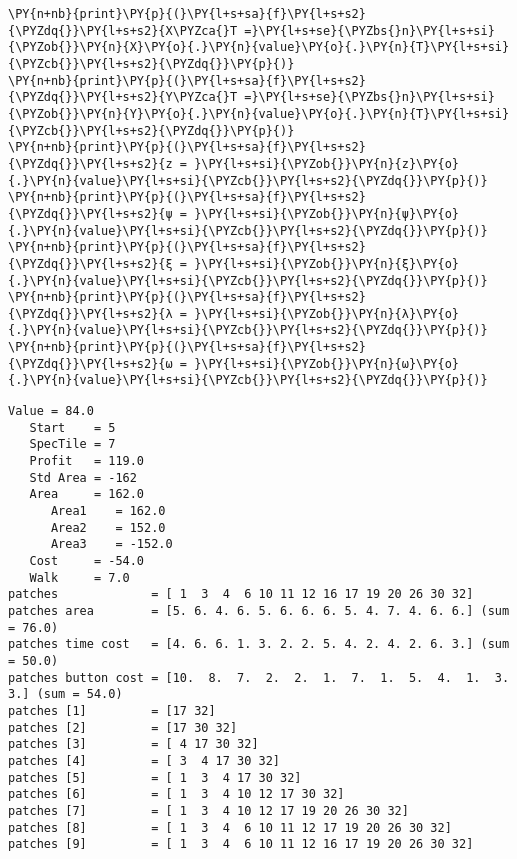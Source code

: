 \begin{tcolorbox}[breakable, size=fbox, boxrule=1pt, pad at break*=1mm,colback=cellbackground, colframe=cellborder]
\begin{Verbatim}[commandchars=\\\{\}]
\PY{n+nb}{print}\PY{p}{(}\PY{l+s+sa}{f}\PY{l+s+s2}{\PYZdq{}}\PY{l+s+s2}{X\PYZca{}T =}\PY{l+s+se}{\PYZbs{}n}\PY{l+s+si}{\PYZob{}}\PY{n}{X}\PY{o}{.}\PY{n}{value}\PY{o}{.}\PY{n}{T}\PY{l+s+si}{\PYZcb{}}\PY{l+s+s2}{\PYZdq{}}\PY{p}{)}
\PY{n+nb}{print}\PY{p}{(}\PY{l+s+sa}{f}\PY{l+s+s2}{\PYZdq{}}\PY{l+s+s2}{Y\PYZca{}T =}\PY{l+s+se}{\PYZbs{}n}\PY{l+s+si}{\PYZob{}}\PY{n}{Y}\PY{o}{.}\PY{n}{value}\PY{o}{.}\PY{n}{T}\PY{l+s+si}{\PYZcb{}}\PY{l+s+s2}{\PYZdq{}}\PY{p}{)}
\PY{n+nb}{print}\PY{p}{(}\PY{l+s+sa}{f}\PY{l+s+s2}{\PYZdq{}}\PY{l+s+s2}{z = }\PY{l+s+si}{\PYZob{}}\PY{n}{z}\PY{o}{.}\PY{n}{value}\PY{l+s+si}{\PYZcb{}}\PY{l+s+s2}{\PYZdq{}}\PY{p}{)}
\PY{n+nb}{print}\PY{p}{(}\PY{l+s+sa}{f}\PY{l+s+s2}{\PYZdq{}}\PY{l+s+s2}{ψ = }\PY{l+s+si}{\PYZob{}}\PY{n}{ψ}\PY{o}{.}\PY{n}{value}\PY{l+s+si}{\PYZcb{}}\PY{l+s+s2}{\PYZdq{}}\PY{p}{)}
\PY{n+nb}{print}\PY{p}{(}\PY{l+s+sa}{f}\PY{l+s+s2}{\PYZdq{}}\PY{l+s+s2}{ξ = }\PY{l+s+si}{\PYZob{}}\PY{n}{ξ}\PY{o}{.}\PY{n}{value}\PY{l+s+si}{\PYZcb{}}\PY{l+s+s2}{\PYZdq{}}\PY{p}{)}
\PY{n+nb}{print}\PY{p}{(}\PY{l+s+sa}{f}\PY{l+s+s2}{\PYZdq{}}\PY{l+s+s2}{λ = }\PY{l+s+si}{\PYZob{}}\PY{n}{λ}\PY{o}{.}\PY{n}{value}\PY{l+s+si}{\PYZcb{}}\PY{l+s+s2}{\PYZdq{}}\PY{p}{)}
\PY{n+nb}{print}\PY{p}{(}\PY{l+s+sa}{f}\PY{l+s+s2}{\PYZdq{}}\PY{l+s+s2}{ω = }\PY{l+s+si}{\PYZob{}}\PY{n}{ω}\PY{o}{.}\PY{n}{value}\PY{l+s+si}{\PYZcb{}}\PY{l+s+s2}{\PYZdq{}}\PY{p}{)}
    \end{Verbatim}
\end{tcolorbox}

\fontsize{8}{8.5}\selectfont %

\begin{Verbatim}[commandchars=\\\{\}]
Value = 84.0
   Start    = 5
   SpecTile = 7
   Profit   = 119.0
   Std Area = -162
   Area     = 162.0
      Area1    = 162.0
      Area2    = 152.0
      Area3    = -152.0
   Cost     = -54.0
   Walk     = 7.0
patches             = [ 1  3  4  6 10 11 12 16 17 19 20 26 30 32]
patches area        = [5. 6. 4. 6. 5. 6. 6. 6. 5. 4. 7. 4. 6. 6.] (sum = 76.0)
patches time cost   = [4. 6. 6. 1. 3. 2. 2. 5. 4. 2. 4. 2. 6. 3.] (sum = 50.0)
patches button cost = [10.  8.  7.  2.  2.  1.  7.  1.  5.  4.  1.  3.  3.] (sum = 54.0)
patches [1]         = [17 32]
patches [2]         = [17 30 32]
patches [3]         = [ 4 17 30 32]
patches [4]         = [ 3  4 17 30 32]
patches [5]         = [ 1  3  4 17 30 32]
patches [6]         = [ 1  3  4 10 12 17 30 32]
patches [7]         = [ 1  3  4 10 12 17 19 20 26 30 32]
patches [8]         = [ 1  3  4  6 10 11 12 17 19 20 26 30 32]
patches [9]         = [ 1  3  4  6 10 11 12 16 17 19 20 26 30 32]
\end{Verbatim}

